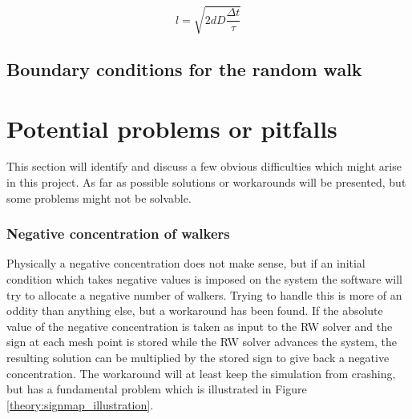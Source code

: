\begin{equation}\label{theory:step_length}
 l = \sqrt{2dD\frac{\Delta t}{\tau}}
\end{equation}

\subsection{Boundary conditions for the random walk}


\section{Potential problems or pitfalls}\label{problems_and_pitfalls}
 
This section will identify and discuss a few obvious difficulties which might arise in this project. As far as possible solutions or workarounds will be presented, but some problems might not be solvable.

% 


 
\subsubsection{Negative concentration of walkers}
Physically a negative concentration does not make sense, but if an initial condition which takes negative values is imposed on the system the software will try to allocate a negative number of walkers. 
Trying to handle this is more of an oddity than anything else, but a workaround has been found. 
If the absolute value of the negative concentration is taken as input to the RW solver and the sign at each mesh point is stored while the RW solver advances the system, the resulting solution can be multiplied by the stored sign to give back a negative concentration. 
The workaround will at least keep the simulation from crashing, but has a fundamental problem which is illustrated in Figure \ref{theory:signmap_illustration}.
  
